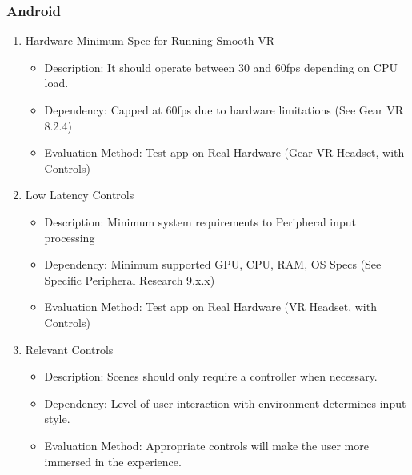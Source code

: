 \documentclass[a4paper,10pt]{article}
\begin{document}
	\subsubsection{Android}
		\begin{enumerate}
			\item Hardware Minimum Spec for Running Smooth VR
			\begin{itemize}
				\item Description: It should operate between 30 and 60fps depending on CPU load.
				\item Dependency: Capped at 60fps due to hardware limitations (See Gear VR 8.2.4)
				\item Evaluation Method: Test app on Real Hardware (Gear VR Headset, with Controls)
			\end{itemize}
			\item Low Latency Controls
			\begin{itemize}
				\item Description: Minimum system requirements to Peripheral input processing
				\item Dependency: Minimum supported GPU, CPU, RAM, OS Specs (See Specific Peripheral Research 9.x.x) 
				\item Evaluation Method: Test app on Real Hardware (VR Headset, with Controls)
			\end{itemize}
			\item Relevant Controls
			\begin{itemize}
				\item Description: Scenes should only require a controller when necessary.
				\item Dependency: Level of user interaction with environment determines input style.
				\item Evaluation Method: Appropriate controls will make the user more immersed in the experience.
			\end{itemize}
		\end{enumerate}
	
\end{document}
